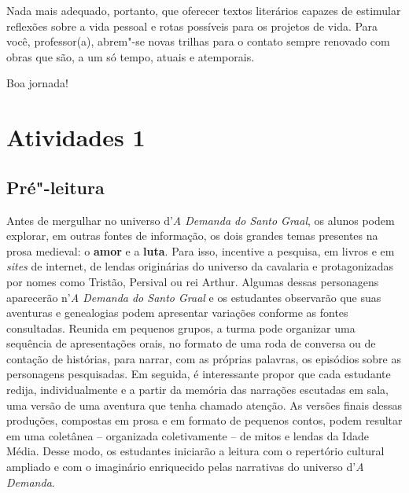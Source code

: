 \documentclass{extarticle}
\begin{document}
Nada mais adequado, portanto, que oferecer textos literários capazes de
estimular reflexões sobre a vida pessoal e rotas possíveis para os
projetos de vida. Para você, professor(a), abrem"-se novas trilhas para o
contato sempre renovado com obras que são, a um só tempo, atuais e
atemporais.

Boa jornada!

\reversemarginpar
\marginparwidth=5cm



\section{Atividades 1}



\subsection{Pré"-leitura}



Antes de mergulhar no universo d'\emph{A Demanda do Santo
Graal}, os alunos podem explorar, em outras fontes de informação, os
dois grandes temas presentes na prosa medieval: o \textbf{amor} e a
\textbf{luta}. Para isso, incentive a pesquisa, em livros e em
\emph{sites} de internet, de lendas originárias do universo da cavalaria
e protagonizadas por nomes como Tristão, Persival ou rei Arthur. Algumas
dessas personagens aparecerão n'\emph{A Demanda do Santo Graal} e os
estudantes observarão que suas aventuras e genealogias podem apresentar
variações conforme as fontes consultadas. Reunida em pequenos grupos, a
turma pode organizar uma sequência de apresentações orais, no formato de
uma roda de conversa ou de contação de histórias, para narrar, com as
próprias palavras, os episódios sobre as personagens pesquisadas. Em
seguida, é interessante propor que cada estudante redija,
individualmente e a partir da memória das narrações escutadas em sala,
uma versão de uma aventura que tenha chamado atenção. As versões finais
dessas produções, compostas em prosa e em formato de pequenos contos,
podem resultar em uma coletânea -- organizada coletivamente -- de mitos
e lendas da Idade Média. Desse modo, os estudantes iniciarão a leitura
com o repertório cultural ampliado e com o imaginário enriquecido pelas
narrativas do universo d'\emph{A Demanda}.
\end{document}
